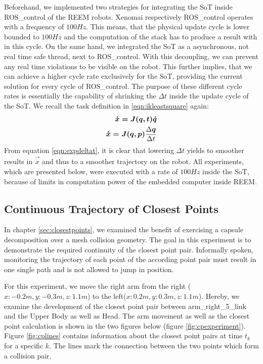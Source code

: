 Beforehand, we implemented two strategies for integrating the SoT inside ROS\_control of the REEM robots. Xenomai respectively ROS\_control operates with a frequency of $100Hz$. This means, that the physical update cycle is lower bounded to $100Hz$ and the computation of the stack has to produce a result with in this cycle. On the same hand, we integrated the SoT as a asynchronous, not real time safe thread, next to ROS\_control. With this decoupling, we can prevent any real time violations to be visible on the robot. This further implies, that we can achieve a higher cycle rate exclusively for the SoT, providing the current solution for every cycle of ROS\_control. 
The purpose of these different cycle rates is essentially the capability of shrinking the $\Delta t$ inside the update cycle of the SoT. We recall the task definition in \ref{eqn:ikleastsquare} again:
\begin{eqnarray}
\vec{\dot{x} = J(q,t) \dot{q}} \notag \\
\vec{\dot{x} = J(q,p)} \frac{\Delta\vec{q}}{\Delta t} \label{eqn:expdeltat}
\end{eqnarray}
From equation \ref{eqn:expdeltat}, it is clear that lowering $\Delta t$ yields to smoother results in $\vec{\dot{x}}$ and thus to a smoother trajectory on the robot. All experiments, which are presented below, were executed with a rate of $100Hz$ inside the SoT, because of limits in computation power of the embedded computer inside REEM.

\subsection{Continuous Trajectory of Closest Points}
In chapter \ref{sec:closestpoints}, we examined the benefit of exercising a capsule decomposition over a mesh collision geometry. The goal in this experiment is to demonstrate the required continuity of the closest point pair. Informally spoken, monitoring the trajectory of each point of the according point pair must result in one single path and is not allowed to jump in position. 

For this experiment, we move the right arm from the right ($x:-0.2m,y:-0.3m,z:1.1m$) to the left($x:0.2m,y:0.3m,z:1.1m$). Hereby, we examine the development of the closest point pair between arm\_right\_5\_link and the Upper Body as well as Head. The arm movement as well as the closest point calculation is shown in the two figures below (figure \ref{fig:cpexperiment}). Figure \ref{fig:cplines} contains information about the closest point pairs at time $t_k$ for a specific $k$. The lines mark the connection between the two points which form a collision pair. 


